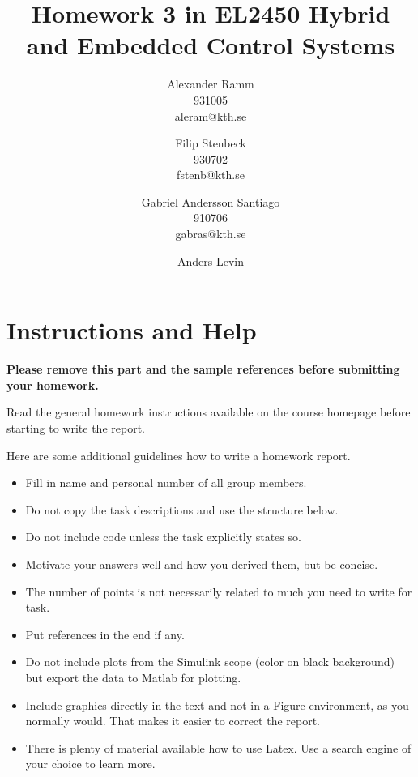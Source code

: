 \documentclass[a4paper,12pt,oneside,onecolumn]{article} %
\begin{document}

\title{Homework 3 in EL2450 Hybrid and Embedded Control Systems}
\author{
  Alexander Ramm \\ 931005 \\ aleram@kth.se 
  \and 
  Filip Stenbeck \\ 930702 \\ fstenb@kth.se
  \and
  Gabriel Andersson Santiago \\ 910706 \\ gabras@kth.se
  \and
  Anders Levin
  }

\maketitle                     %





\section*{Instructions and Help}

\textbf{Please remove this part and the sample references before submitting your homework.}

Read the general homework instructions available on the course homepage before starting to write the report.

Here are some additional guidelines how to write a homework report.
\begin{itemize}
 \item Fill in name and personal number of all group members.
 \item Do not copy the task descriptions and use the structure below.
 \item Do not include code unless the task explicitly states so.
 \item Motivate your answers well and how you derived them, but be concise.
 \item The number of points is not necessarily related to much you need to write for task.
 \item Put references in the end if any.
 \item Do not include plots from the Simulink scope (color on black background) but export the data to Matlab for plotting.
 \item Include graphics directly in the text and not in a Figure environment, as you normally would. That makes it easier to correct the report.
 \item There is plenty of material available how to use Latex. Use a search engine of your choice to learn more.
\end{itemize}
\end{document}
